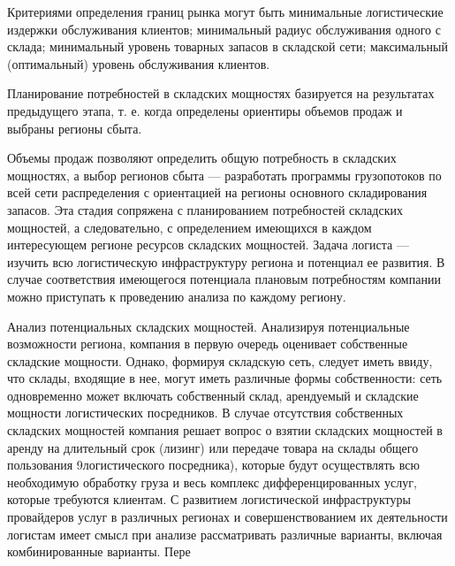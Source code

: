 Критериями определения границ рынка могут быть минимальные логистические издержки обслуживания клиентов; минимальный радиус обслуживания одного с склада; минимальный уровень товарных запасов в складской сети; максимальный (оптимальный) уровень обслуживания клиентов.

Планирование потребностей в складских мощностях базируется на результатах предыдущего этапа, т. е. когда определены ориентиры объемов продаж и выбраны регионы сбыта.

Объемы продаж позволяют определить общую потребность в складских мощностях, а выбор регионов сбыта --- разработать программы грузопотоков по всей сети распределения с ориентацией на регионы основного складирования запасов.
Эта стадия сопряжена с планированием потребностей складских мощностей, а следовательно, с определением имеющихся в каждом интересующем регионе ресурсов складских мощностей.
Задача логиста --- изучить всю логистическую инфраструктуру региона и потенциал ее развития.
В случае соответствия имеющегося потенциала плановым потребностям компании можно приступать к проведению анализа по каждому региону.

Анализ потенциальных складских мощностей.
Анализируя потенциальные возможности региона, компания в первую очередь оценивает собственные складские мощности.
Однако, формируя складскую сеть, следует иметь ввиду, что склады, входящие в нее, могут иметь различные формы собственности: сеть одновременно может включать собственный склад, арендуемый и складские мощности логистических посредников.
В случае отсутствия собственных складских мощностей компания решает вопрос о взятии складских мощностей в аренду на длительный срок (лизинг) или передаче товара на склады общего пользования 9логистического посредника), которые будут осуществлять всю необходимую обработку груза и весь комплекс дифференцированных услуг, которые требуются клиентам.
С развитием логистической инфраструктуры провайдеров услуг в различных регионах и совершенствованием их деятельности логистам имеет смысл при анализе рассматривать различные варианты, включая комбинированные варианты.
Пере